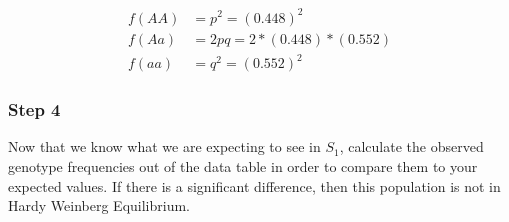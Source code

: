 \documentclass[12pt]{article}
\begin{document}
\begin{align*}
    f(AA) &= p^2 = (0.448)^2 \\
    f(Aa) &= 2pq = 2*(0.448)*(0.552) \\
    f(aa) &= q^2 = (0.552)^2
\end{align*}

\subsubsection{Step 4}

Now that we know what we are expecting to see in $S_1$, calculate the observed genotype frequencies out of the data table in order to compare them to your expected values. If there is a significant difference, then this population is not in Hardy Weinberg Equilibrium.



\printbibliography
\end{document}

